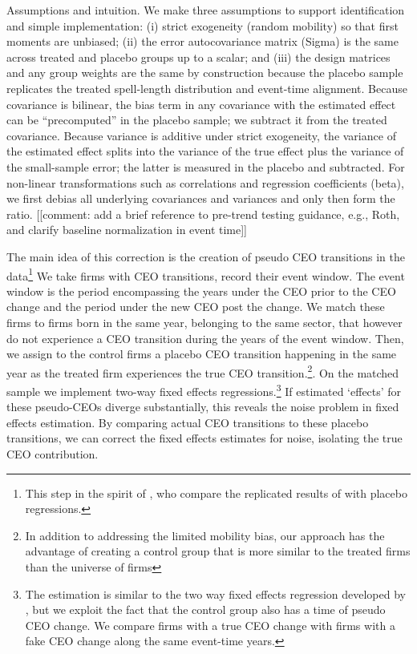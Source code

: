 \documentclass[11pt,a4paper]{article}
\begin{document}
Assumptions and intuition. We make three assumptions to support identification and simple implementation: (i) strict exogeneity (random mobility) so that first moments are unbiased; (ii) the error autocovariance matrix (Sigma) is the same across treated and placebo groups up to a scalar; and (iii) the design matrices and any group weights are the same by construction because the placebo sample replicates the treated spell-length distribution and event-time alignment. Because covariance is bilinear, the bias term in any covariance with the estimated effect can be “precomputed” in the placebo sample; we subtract it from the treated covariance. Because variance is additive under strict exogeneity, the variance of the estimated effect splits into the variance of the true effect plus the variance of the small-sample error; the latter is measured in the placebo and subtracted. For non-linear transformations such as correlations and regression coefficients (beta), we first debias all underlying covariances and variances and only then form the ratio. [[comment: add a brief reference to pre-trend testing guidance, e.g., Roth, and clarify baseline normalization in event time]]

The main idea of this correction is the creation of pseudo CEO transitions in the data\footnote{This step in the spirit of \cite{jarosiewicz2023revisiting}, who compare the replicated results of  \cite{Bertrand2003-io} with placebo regressions.} We take firms with CEO transitions, record their event window. The event window is the period encompassing the years under the CEO prior to the CEO change and the period under the new CEO post the change. We match these firms to firms born in the same year, belonging to the same sector, that however do not experience a CEO transition during the years of the event window. Then, we assign to the control firms a placebo CEO transition happening in the same year as the treated firm experiences the true CEO transition.\footnote{In addition to addressing the limited mobility bias, our approach has the advantage of creating a control group that is more similar to the treated firms than the universe of firms}. On the matched sample we implement two-way fixed effects regressions.\footnote{The estimation is similar to the two way fixed effects regression developed by \cite{Callaway2021JoLE}, but we exploit the fact that the control group also has a time of pseudo CEO change. We compare firms with a true CEO change with firms with a fake CEO change along the same event-time years.} If estimated `effects' for these pseudo-CEOs diverge substantially, this reveals the noise problem in fixed effects estimation. By comparing actual CEO transitions to these placebo transitions, we can correct the fixed effects estimates for noise, isolating the true CEO contribution.
\end{document}
